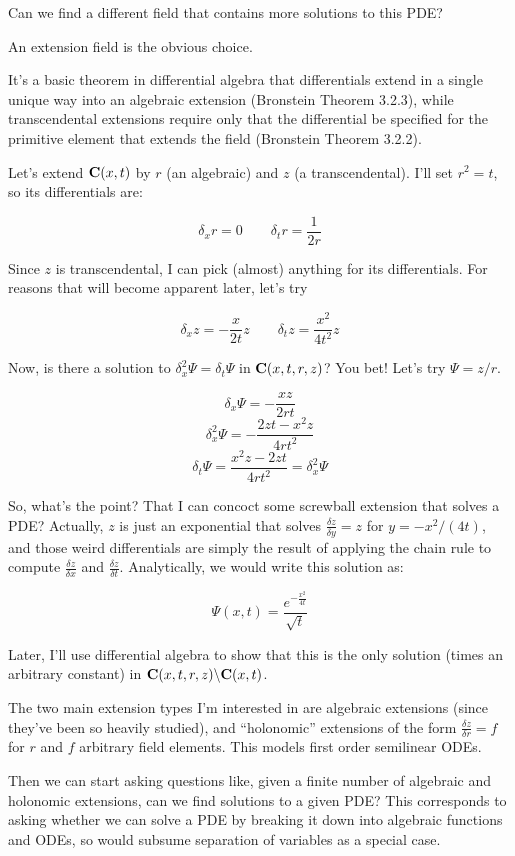 \documentclass{article}
\newcommand{\C}{\ensuremath{{\bf C}}}
\begin{document}
Can we find a different field that contains more solutions to this PDE?

An extension field is the obvious choice.

It's a basic theorem in differential algebra that differentials extend
in a single unique way into an algebraic extension (Bronstein Theorem
3.2.3), while transcendental extensions require only that the
differential be specified for the primitive element that extends the
field (Bronstein Theorem 3.2.2).

Let's extend $\C(x,t)$ by $r$ (an algebraic) and $z$ (a
transcendental).  I'll set $r^2 = t$, so its differentials are:

$$\delta_x r = 0 \qquad \delta_t r = \frac{1}{2r} $$


Since $z$ is transcendental, I can pick (almost) anything for its differentials.  For
reasons that will become apparent later, let's try

$$\delta_x z = -\frac{x}{2t} z \qquad \delta_t z = \frac{x^2}{4t^2} z$$

Now, is there a solution to $\delta_x^2 \Psi = \delta_t \Psi$ in
$\C(x,t,r,z)$?  You bet!  Let's try $\Psi = z/r$.

$$\delta_x \Psi = - \frac{xz}{2rt}$$
$$\delta_x^2 \Psi = - \frac{2zt-x^2z}{4rt^2}$$
$$\delta_t \Psi =  \frac{x^2z - 2zt}{4rt^2} = \delta_x^2 \Psi$$

So, what's the point?  That I can concoct some screwball extension
that solves a PDE?  Actually, $z$ is just an exponential that solves
$\frac{\delta z}{\delta y}=z$ for $y=-x^2/(4t)$, and those weird
differentials are simply the result of applying the chain rule
to compute $\frac{\delta z}{\delta x}$ and $\frac{\delta z}{\delta t}$.
Analytically, we would write this solution as:

$$\Psi(x,t) = \frac{e^{-\frac{x^2}{4t}}}{\sqrt{t}}$$

Later, I'll use differential algebra to show that this is the only
solution (times an arbitrary constant) in $\C(x,t,r,z) \backslash \C(x,t)$.

The two main extension types I'm interested in are algebraic
extensions (since they've been so heavily studied), and ``holonomic''
extensions of the form $\frac{\delta z}{\delta r} = f$ for $r$ and
$f$ arbitrary field elements.  This models first order semilinear ODEs.

Then we can start asking questions like, given a finite number of
algebraic and holonomic extensions, can we find solutions to a given
PDE?  This corresponds to asking whether we can solve a PDE by
breaking it down into algebraic functions and ODEs, so would subsume
separation of variables as a special case.
\end{document}
